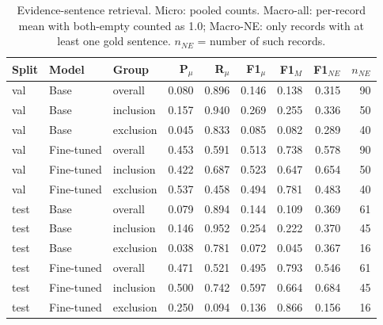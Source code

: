\begin{table}[t]
\centering
\caption{Evidence-sentence retrieval. Micro: pooled counts. Macro-all: per-record mean with both-empty counted as 1.0; Macro-NE: only records with at least one gold sentence. $n_{NE}$ = number of such records.}
\label{tab:evidence}
\footnotesize
\begin{tabular}{lllrrrrrr}
\toprule
Split & Model & Group & P$_\mu$ & R$_\mu$ & F1$_\mu$ & F1$_{M}$ & F1$_{NE}$ & $n_{NE}$ \\
\midrule
val & Base & overall & 0.080 & 0.896 & 0.146 & 0.138 & 0.315 & 90 \\
val & Base & inclusion & 0.157 & 0.940 & 0.269 & 0.255 & 0.336 & 50 \\
val & Base & exclusion & 0.045 & 0.833 & 0.085 & 0.082 & 0.289 & 40 \\
val & Fine-tuned & overall & 0.453 & 0.591 & 0.513 & 0.738 & 0.578 & 90 \\
val & Fine-tuned & inclusion & 0.422 & 0.687 & 0.523 & 0.647 & 0.654 & 50 \\
val & Fine-tuned & exclusion & 0.537 & 0.458 & 0.494 & 0.781 & 0.483 & 40 \\
test & Base & overall & 0.079 & 0.894 & 0.144 & 0.109 & 0.369 & 61 \\
test & Base & inclusion & 0.146 & 0.952 & 0.254 & 0.222 & 0.370 & 45 \\
test & Base & exclusion & 0.038 & 0.781 & 0.072 & 0.045 & 0.367 & 16 \\
test & Fine-tuned & overall & 0.471 & 0.521 & 0.495 & 0.793 & 0.546 & 61 \\
test & Fine-tuned & inclusion & 0.500 & 0.742 & 0.597 & 0.664 & 0.684 & 45 \\
test & Fine-tuned & exclusion & 0.250 & 0.094 & 0.136 & 0.866 & 0.156 & 16 \\
\bottomrule
\end{tabular}
\end{table}

